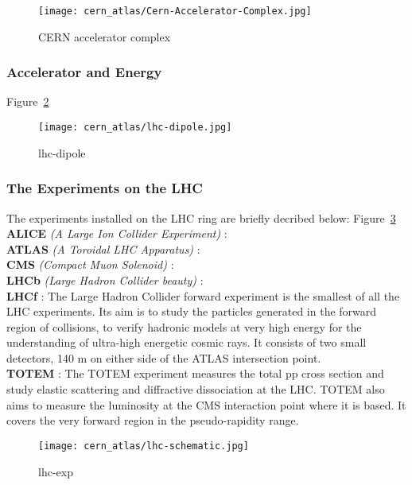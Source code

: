 \begin{figure}[htbp]
  \centering
	\texttt{[image: cern\_atlas/Cern-Accelerator-Complex.jpg]}
	\caption[CERN accelerator complex]{CERN accelerator complex}
	\label{CERNcomplex}
\end{figure}
\subsubsection{Accelerator and Energy}
Figure~\ref{lhc-dipole}
\begin{figure}[htbp]
  \centering
  \texttt{[image: cern\_atlas/lhc-dipole.jpg]}
  \caption[lhc-dipole]{lhc-dipole}
  \label{lhc-dipole}
\end{figure}
\subsubsection{The Experiments on the LHC}
The experiments installed on the LHC ring are briefly decribed below:
Figure~\ref{lhc-exp}
\\
{\bf ALICE} {\it (A Large Ion Collider Experiment)} \cite{ALICE}:
\\
{\bf ATLAS} {\it (A Toroidal LHC Apparatus)} \cite{ATLAS}:
\\
{\bf CMS} {\it (Compact Muon Solenoid)} \cite{CMS}:
\\
{\bf LHCb} {\it (Large Hadron Collider beauty)} \cite{LHCb}:
\\

{\bf LHCf} \cite{LHCf} :
The Large Hadron Collider forward experiment is the smallest of all the LHC experiments. Its aim is to study the particles generated in the forward region of collisions,	to verify hadronic models at very high energy for the understanding of ultra-high energetic cosmic rays. It consists of two small detectors, 140 m on either side of the ATLAS intersection point.
\\

{\bf TOTEM} \cite{TOTEM}:
The TOTEM experiment measures the total pp cross section and study
elastic scattering and diffractive dissociation at the LHC. TOTEM also aims to measure
the luminosity at the CMS interaction point where it is based. It covers the
very forward region in the pseudo-rapidity range.
\\

\begin{figure}[htbp]
  \centering
  \texttt{[image: cern\_atlas/lhc-schematic.jpg]}
  \caption[lhc-exp]{lhc-exp}
  \label{lhc-exp}
\end{figure}

